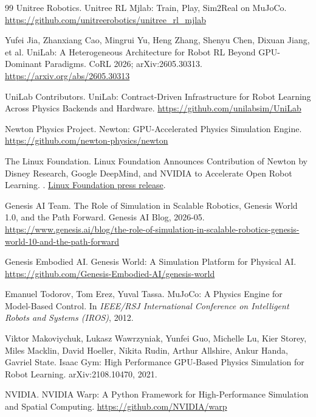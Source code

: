 \documentclass[UTF8, 11pt, a4paper, fontset=windows]{ctexart}
\begin{document}
\begin{thebibliography}{99}
Unitree Robotics.
\newblock Unitree RL Mjlab: Train, Play, Sim2Real on MuJoCo.
\newblock \url{https://github.com/unitreerobotics/unitree_rl_mjlab}

Yufei Jia, Zhanxiang Cao, Mingrui Yu, Heng Zhang, Shenyu Chen, Dixuan Jiang, et al.
\newblock UniLab: A Heterogeneous Architecture for Robot RL Beyond GPU-Dominant Paradigms.
\newblock CoRL 2026; arXiv:2605.30313.
\newblock \url{https://arxiv.org/abs/2605.30313}

UniLab Contributors.
\newblock UniLab: Contract-Driven Infrastructure for Robot Learning Across Physics Backends and Hardware.
\newblock \url{https://github.com/unilabsim/UniLab}

Newton Physics Project.
\newblock Newton: GPU-Accelerated Physics Simulation Engine.
\newblock \url{https://github.com/newton-physics/newton}

The Linux Foundation.
\newblock Linux Foundation Announces Contribution of Newton by Disney Research, Google DeepMind, and NVIDIA
to Accelerate Open Robot Learning.
.
\newblock \href{https://www.linuxfoundation.org/press/linux-foundation-announces-contribution-of-newton-by-disney-research-google-deepmind-and-nvidia-to-accelerate-open-robot-learning}{Linux Foundation press release}.

Genesis AI Team.
\newblock The Role of Simulation in Scalable Robotics, Genesis World 1.0, and the Path Forward.
\newblock Genesis AI Blog, 2026-05.
\newblock \url{https://www.genesis.ai/blog/the-role-of-simulation-in-scalable-robotics-genesis-world-10-and-the-path-forward}

Genesis Embodied AI.
\newblock Genesis World: A Simulation Platform for Physical AI.
\newblock \url{https://github.com/Genesis-Embodied-AI/genesis-world}

Emanuel Todorov, Tom Erez, Yuval Tassa.
\newblock MuJoCo: A Physics Engine for Model-Based Control.
\newblock In \emph{IEEE/RSJ International Conference on Intelligent Robots and Systems (IROS)}, 2012.

Viktor Makoviychuk, Lukasz Wawrzyniak, Yunfei Guo, Michelle Lu, Kier Storey, Miles Macklin,
David Hoeller, Nikita Rudin, Arthur Allshire, Ankur Handa, Gavriel State.
\newblock Isaac Gym: High Performance GPU-Based Physics Simulation for Robot Learning.
\newblock arXiv:2108.10470, 2021.

NVIDIA.
\newblock NVIDIA Warp: A Python Framework for High-Performance Simulation and Spatial Computing.
\newblock \url{https://github.com/NVIDIA/warp}

\end{thebibliography}
\end{document}
